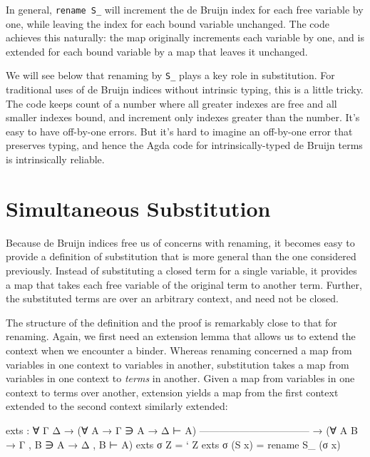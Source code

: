 In general, \texttt{rename\ S\_} will increment the de Bruijn index for
each free variable by one, while leaving the index for each bound
variable unchanged. The code achieves this naturally: the map originally
increments each variable by one, and is extended for each bound variable
by a map that leaves it unchanged.

We will see below that renaming by \texttt{S\_} plays a key role in
substitution. For traditional uses of de Bruijn indices without
intrinsic typing, this is a little tricky. The code keeps count of a
number where all greater indexes are free and all smaller indexes bound,
and increment only indexes greater than the number. It's easy to have
off-by-one errors. But it's hard to imagine an off-by-one error that
preserves typing, and hence the Agda code for intrinsically-typed de
Bruijn terms is intrinsically reliable.

\hypertarget{simultaneous-substitution}{%
\section{Simultaneous Substitution}\label{simultaneous-substitution}}

Because de Bruijn indices free us of concerns with renaming, it becomes
easy to provide a definition of substitution that is more general than
the one considered previously. Instead of substituting a closed term for
a single variable, it provides a map that takes each free variable of
the original term to another term. Further, the substituted terms are
over an arbitrary context, and need not be closed.

The structure of the definition and the proof is remarkably close to
that for renaming. Again, we first need an extension lemma that allows
us to extend the context when we encounter a binder. Whereas renaming
concerned a map from variables in one context to variables in another,
substitution takes a map from variables in one context to \emph{terms}
in another. Given a map from variables in one context to terms over
another, extension yields a map from the first context extended to the
second context similarly extended:

\begin{fence}
\begin{code}
exts : ∀ {Γ Δ}
  → (∀ {A} →       Γ ∋ A →     Δ ⊢ A)
    ---------------------------------
  → (∀ {A B} → Γ , B ∋ A → Δ , B ⊢ A)
exts σ Z      =  ` Z
exts σ (S x)  =  rename S_ (σ x)
\end{code}
\end{fence}

